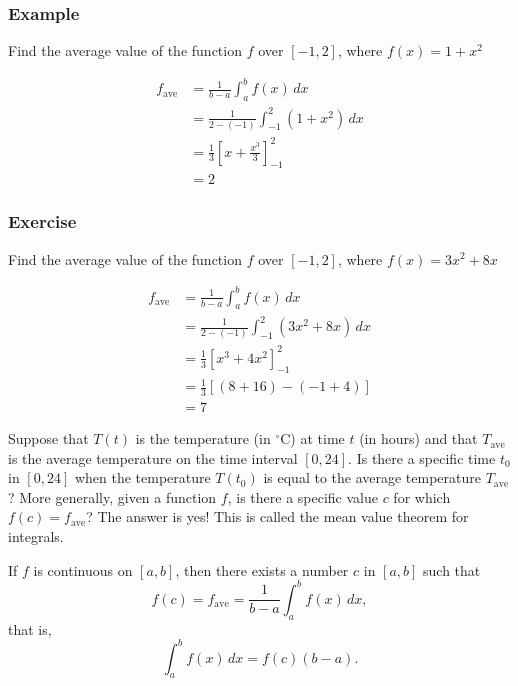 \documentclass[t]{beamer}
\theoremstyle{plain}
\theoremstyle{definition}
\begin{document}
\begin{frame}
\frametitle{Example}
Find the average value of the function $f$ over $[-1,2]$, where $f(x)=1+x^2$ \pause

\begin{align*}
f_{\textrm{ave}} &= \frac{1}{b-a}\int_{a}^{b}f(x)\, dx\\
	                         &= \frac{1}{2-(-1)}\int_{-1}^{2}(1 + x^2) \,dx\\
	                         &= \frac{1}{3}\left[x + \frac{x^3}{3} \right]^{2}_{-1}\\
	                         &=2
\end{align*}

\end{frame}

\begin{frame}
\frametitle{Exercise}
Find the average value of the function $f$ over $[-1,2]$, where $f(x)=3x^2 + 8x$ \pause

\begin{align*}
f_{\textrm{ave}} &= \frac{1}{b-a}\int_{a}^{b}f(x)\, dx\\
	                         &= \frac{1}{2-(-1)}\int_{-1}^{2}(3x^2 + 8x) \,dx\\
	                         &= \frac{1}{3}\left[x^3 + 4x^2 \right]^{2}_{-1}\\
	                         &=\frac{1}{3}\left[(8 + 16) - (-1 +4) \right]\\
	                         &=7
\end{align*}

\end{frame}

\begin{frame}
\noindent Suppose that $T(t)$ is the temperature (in ${}^{\circ}$C) at time $t$ (in hours) and that $T_{\mathrm{ave}}$ is the average temperature on the time interval $[0,24]$. Is there a specific time $t_0$ in $[0,24]$ when the temperature $T(t_0)$ is equal to the average temperature $T_{\mathrm{ave}}$?  More generally, given a function $f$, is there a specific value $c$ for which $f(c)=f_{\mathrm{ave}}$?  The answer is yes!  This is called the mean value theorem for integrals.

\begin{theorem}
If $f$ is continuous on $[a,b]$, then there exists a number $c$ in $[a,b]$ such that
\[f(c) = f_{\textrm{ave}} = \frac{1}{b-a}\int_{a}^{b}f(x)\,dx,\]
that is,
\[ \int_{a}^{b}f(x)\,dx = f(c)(b-a).\]
\end{theorem} 

\end{frame}
\end{document}
